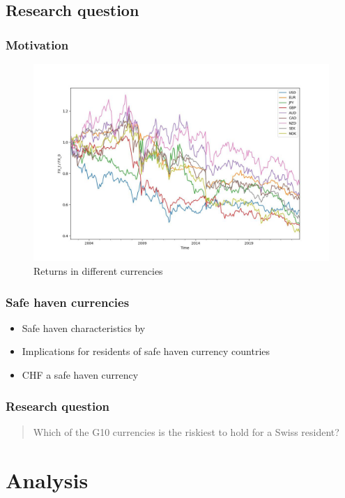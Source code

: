 \documentclass[11pt,]{beamer}
\begin{document}
\subsection{Research question}
\begin{frame}
	\frametitle{Motivation}
	\begin{figure}
		\includegraphics[width=0.8\linewidth]{figures/ccy_perfs.jpg}
		\caption{Returns in different currencies}
	\end{figure}
\end{frame}
\begin{frame}
    \frametitle{Safe haven currencies}
    \begin{itemize}
    \setlength\itemsep{2em}
    \item Safe haven characteristics by \cite{Habib and Stracca 2012}
    \item Implications for residents of safe haven currency countries 
    \item CHF a safe haven currency
    \end{itemize}
\end{frame}
\begin{frame}
	\frametitle{Research question}
	\bigskip
	\begin{quote}
    {\Large Which of the G10 currencies is the riskiest to hold for a Swiss resident?}
	\end{quote}
	\bigskip
\end{frame}
\section{Analysis}
\end{document}
